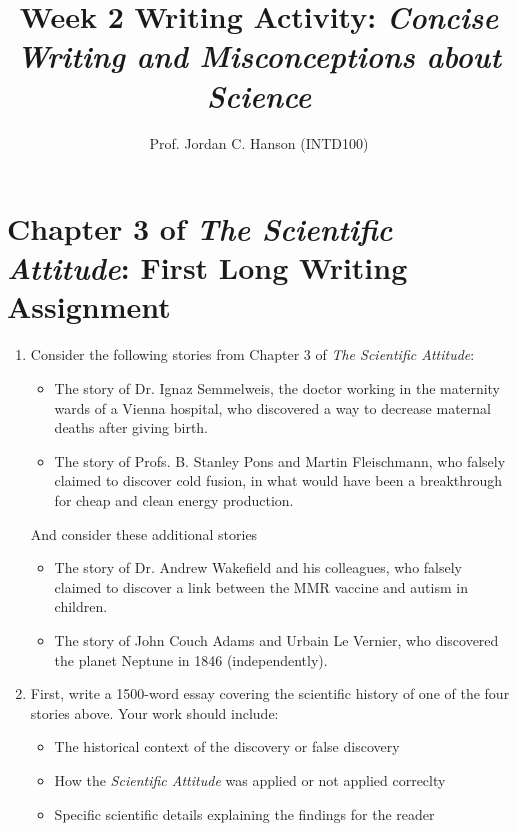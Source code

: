 \documentclass{article}
\begin{document}
\title{Week 2 Writing Activity: \textit{Concise Writing and Misconceptions about Science}}
\author{Prof. Jordan C. Hanson (INTD100)}

\maketitle

\section{Chapter 3 of \textit{The Scientific Attitude}: First Long Writing Assignment}

\begin{enumerate}
\item Consider the following stories from Chapter 3 of \textit{The Scientific Attitude}:
\begin{itemize}
\item The story of Dr. Ignaz Semmelweis, the doctor working in the maternity wards of a Vienna hospital, who discovered a way to decrease maternal deaths after giving birth.
\item The story of Profs. B. Stanley Pons and Martin Fleischmann, who falsely claimed to discover cold fusion, in what would have been a breakthrough for cheap and clean energy production.
\end{itemize}
And consider these additional stories
\begin{itemize}
\item The story of Dr. Andrew Wakefield and his colleagues, who falsely claimed to discover a link between the MMR vaccine and autism in children.
\item The story of John Couch Adams and Urbain Le Vernier, who discovered the planet Neptune in 1846 (independently).
\end{itemize}
\item First, write a 1500-word essay covering the scientific history of one of the four stories above.  Your work should include:
\begin{itemize}
\item The historical context of the discovery or false discovery
\item How the \textit{Scientific Attitude} was applied or not applied correclty
\item Specific scientific details explaining the findings for the reader
\end{itemize}
\end{enumerate}
\end{document}
